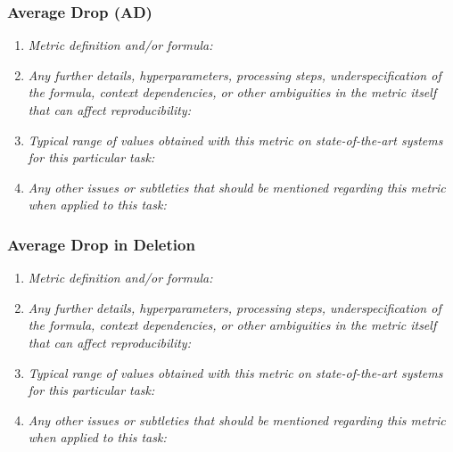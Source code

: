\documentclass[a4paper,11pt]{article}
\begin{document}
        \subsubsection{Average Drop (AD)}
            \begin{enumerate}[label=\alph*.]
                \item \textit{Metric definition and/or formula:}
                \bigskip
                \item \textit{Any further details, hyperparameters, processing steps, underspecification of the formula, context dependencies, or other ambiguities in the metric itself that can affect reproducibility:}
                \bigskip
                \item \textit{Typical range of values obtained with this metric on state-of-the-art systems for this particular task:}
                \bigskip
                \item \textit{Any other issues or subtleties that should be mentioned regarding this metric when applied to this task:}
                \bigskip
            \end{enumerate}
        \subsubsection{Average Drop in Deletion}
            \begin{enumerate}[label=\alph*.]
                \item \textit{Metric definition and/or formula:}
                \bigskip
                \item \textit{Any further details, hyperparameters, processing steps, underspecification of the formula, context dependencies, or other ambiguities in the metric itself that can affect reproducibility:}
                \bigskip
                \item \textit{Typical range of values obtained with this metric on state-of-the-art systems for this particular task:}
                \bigskip
                \item \textit{Any other issues or subtleties that should be mentioned regarding this metric when applied to this task:}
                \bigskip
            \end{enumerate}
\end{document}
